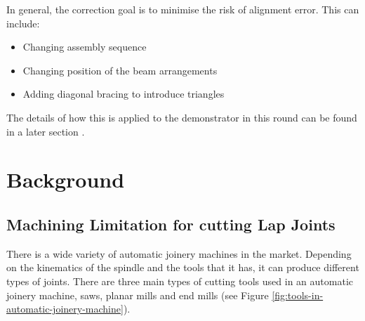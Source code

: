 In general, the correction goal is to minimise the risk of alignment error. This can include:
\begin{itemize}
    \item Changing assembly sequence
    \item Changing position of the beam arrangements
    \item Adding diagonal bracing to introduce triangles
\end{itemize}

The details of how this is applied to the demonstrator in this round can be found in a later section .

\section{Background}
\label{section:exploration-4-background}

\subsection{Machining Limitation for cutting Lap Joints}
\label{subsection:exploration-4-cnc-limitation-in-cutting-lap-joints}

There is a wide variety of automatic joinery machines in the market. Depending on the kinematics of the spindle and the tools that it has, it can produce different types of joints. There are three main types of cutting tools used in an automatic joinery machine, saws, planar mills and end mills (see Figure \ref{fig:tools-in-automatic-joinery-machine}). 


